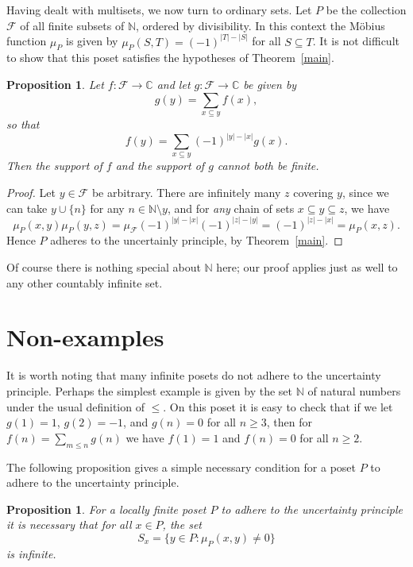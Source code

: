 \documentclass[11pt]{amsart}
\newtheorem{proposition}[theorem]{Proposition}
\theoremstyle{myexample}
\theoremstyle{myremark}
\theoremstyle{conjecture}
\numberwithin{equation}{section}
\def\F{{\mathcal F}}
\def\CC{\mathbb{C}}
\def\NN{\mathbb{N}}
\begin{document}
\medskip{}\enspace
Having dealt with multisets, we now turn to ordinary sets.
Let $P$ be the collection $\F$ of all finite subsets of $\NN$, ordered
by divisibility. In this context the M\"obius function $\mu_P$ is given by $\mu_P(S, T)  = (-1)^{|T|-|S|}$
for all $S\subseteq T$. It is not difficult to show that this poset satisfies the hypotheses of
Theorem~\ref{main}.

\begin{proposition}\label{subsets}
Let $f:\F\to \CC$ and let $g:\F\to \CC$ be given by
$$g(y) = \sum_{x\subseteq y} f(x),$$
so that
$$f(y) = \sum_{x\subseteq y} (-1)^{|y|-|x|} g(x).$$
Then the support of $f$ and the support of $g$ cannot both be finite.
\end{proposition}

\begin{proof}
Let $y\in \F$ be arbitrary. There are infinitely many $z$ covering $y$, since we can take
$y\cup \{n\}$ for any $n\in \NN\setminus y$, and for {\it any} chain of
sets $x\subseteq y\subseteq z$, we have
$$\mu_P(x,y)\mu_P(y,z) = \mu_\F(-1)^{|y|- |x|} (-1)^{|z|-|y|} = (-1)^{|z|-|x|} = \mu_P(x,z).$$
Hence $P$ adheres to the uncertainly principle, by Theorem~\ref{main}.
\end{proof}

Of course there is nothing special about $\NN$ here; our proof applies just as well to any other
countably infinite set.

\section{Non-examples}

It is worth noting that many infinite posets do not adhere to the uncertainty principle. Perhaps the simplest
example is given by the set $\NN$ of natural numbers under the usual definition of $\le$.
On this poset it is easy to check that
if we let $g(1) = 1$, $g(2) = -1$, and $g(n) = 0$ for all $n\ge 3$, then for $f(n) = \sum_{m\le n} g(n)$ we
have $f(1) = 1$ and $f(n) = 0$ for all $n\ge 2$.

The following proposition gives a simple necessary condition for a poset $P$ to adhere to the uncertainty
principle.

\begin{proposition}\label{necessary}
For a locally finite poset $P$ to adhere to
the uncertainty principle it is necessary that for all $x\in P$, the set
$$S_x = \{y \in P : \mu_P(x,y) \ne 0\}$$
is infinite.
\end{proposition}
\end{document}
